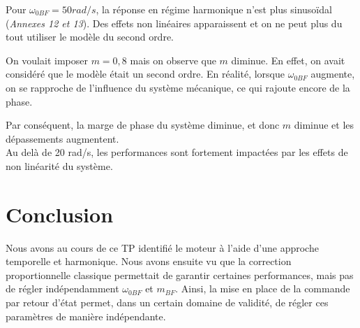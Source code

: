 \documentclass[../../Cours_M1.tex]{subfiles}
\begin{document}
\begin{itemize}
\begin{itemize}
Pour $\omega_{0BF}=50rad /s$, la réponse en régime harmonique n'est plus sinusoïdal (\emph{Annexes 12 et 13}). Des effets non linéaires apparaissent et on ne peut plus du tout utiliser le modèle du second ordre.

On voulait imposer $m=0,8$ mais on observe que $m$ diminue. En effet, on avait considéré que le modèle était un second ordre. En réalité, lorsque $\omega_{0BF}$ augmente, on se rapproche de l'influence du système mécanique, ce qui rajoute encore de la phase. 

Par conséquent, la marge de phase du système diminue, et donc $m$ diminue et les dépassements augmentent.\\

Au delà de 20 rad/s, les performances sont fortement impactées par les effets de non linéarité du système.
\end{itemize}

\end{itemize}

\section*{Conclusion}
Nous avons au cours de ce TP identifié le moteur à l'aide d'une approche temporelle et harmonique. Nous avons ensuite vu que la correction proportionnelle classique permettait de garantir certaines performances, mais pas de régler indépendamment $\omega_{0BF}$ et $m_{BF}$. Ainsi, la mise en place de la commande par retour d'état permet, dans un certain domaine de validité, de régler ces paramètres de manière indépendante.
\end{document}
